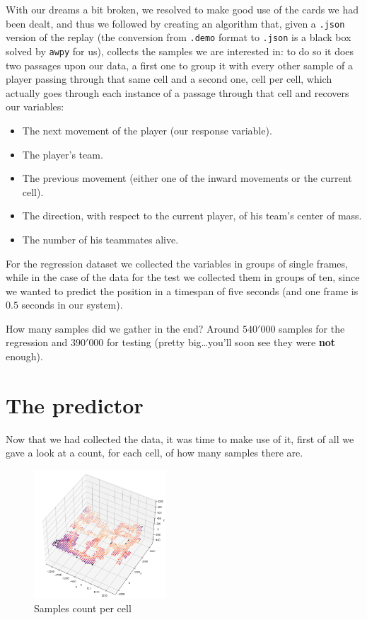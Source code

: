 \documentclass[9pt, a4paper]{IEEEtran}
\begin{document}
    With our dreams a bit broken, we resolved to make good use of the cards we had been dealt, and thus we followed by creating an algorithm that, given a \texttt{.json} version of the replay (the conversion from \texttt{.demo} format to \texttt{.json} is a black box solved by \texttt{awpy} for us), collects the samples we are interested in: to do so it does two passages upon our data, a first one to group it with every other sample of a player passing through that same cell and a second one, cell per cell, which actually goes through each instance of a passage through that cell and recovers our variables:

    \begin{itemize}
        \item The next movement of the player (our response variable).
        \item The player's team.
        \item The previous movement (either one of the inward movements or the current cell).
        \item The direction, with respect to the current player, of his team's center of mass.
        \item The number of his teammates alive.
    \end{itemize}

    For the regression dataset we collected the variables in groups of single frames, while in the case of the data for the test we collected them in groups of ten, since we wanted to predict the position in a timespan of five seconds (and one frame is $0.5$ seconds in our system).

    How many samples did we gather in the end? Around $540'000$ samples for the regression and $390'000$ for testing (pretty big\dots you'll soon see they were \textbf{not} enough). 

    \section{The predictor}
    Now that we had collected the data, it was time to make use of it, first of all we gave a look at a count, for each cell, of how many samples there are.

    \begin{figure}[h]
        \caption{Samples count per cell}
        \centering
        \includegraphics[width=0.44\textwidth]{images/samples_count.png}
    \end{figure}
\end{document}
